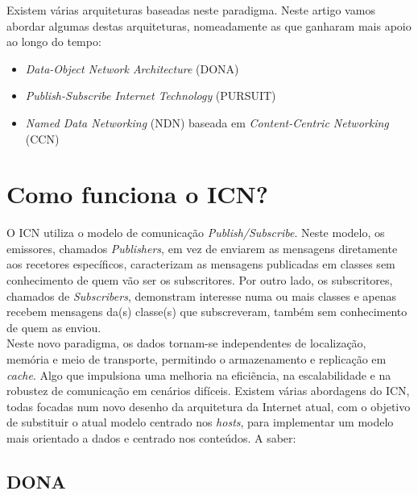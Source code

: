 \documentclass[conference]{IEEEtran}
\begin{document}
Existem v\'{a}rias arquiteturas baseadas neste paradigma. Neste artigo vamos abordar algumas destas arquiteturas, nomeadamente as que ganharam mais apoio ao longo do tempo: \\

\begin{itemize}
\item \textit{Data-Object Network Architecture} (DONA)
\item \textit{Publish-Subscribe Internet Technology} (PURSUIT)
\item \textit{Named Data Networking} (NDN) baseada em \textit{Content-Centric Networking} (CCN) 
\end{itemize}



\section{Como funciona o ICN?}

O ICN utiliza o modelo de comunica\c{c}\~{a}o \textit{Publish/Subscribe}. Neste modelo, os emissores, chamados \textit{Publishers}, em vez de enviarem as mensagens diretamente aos recetores espec\'{i}ficos, caracterizam as mensagens publicadas em classes sem conhecimento de quem v\~{a}o ser os subscritores. Por outro lado, os subscritores, chamados de \textit{Subscribers}, demonstram interesse numa ou mais classes e apenas recebem mensagens da(s) classe(s) que subscreveram, tamb\'{e}m sem conhecimento de quem as enviou.\\ %

Neste novo paradigma, os dados tornam-se independentes de localiza\c{c}\~{a}o, mem\'{o}ria e meio de transporte, permitindo o armazenamento e replica\c{c}\~{a}o em \textit{cache}. Algo que impulsiona uma melhoria na efici\~{e}ncia, na escalabilidade e na robustez de comunica\c{c}\~{a}o em cen\'{a}rios dif\'{i}ceis. Existem v\'{a}rias abordagens do ICN, todas focadas num novo desenho da arquitetura da Internet atual, com o objetivo de substituir o atual modelo centrado nos \textit{hosts}, para implementar um modelo mais orientado a dados e centrado nos conte\'{u}dos\cite{surveyICN}. A saber:\\



\subsection{DONA}
\end{document}
